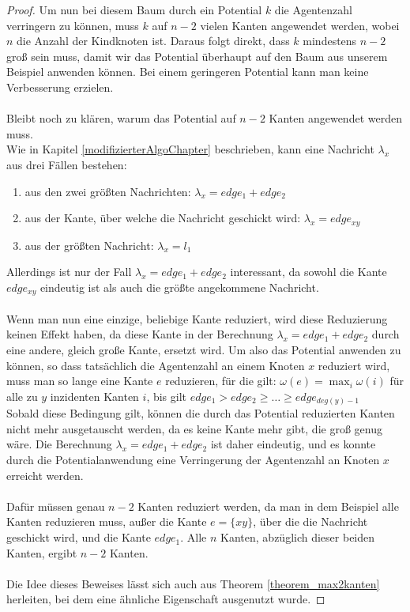 \begin{proof}
	Um nun bei diesem Baum durch ein Potential $k$ die Agentenzahl verringern zu können, muss $k$ auf $n-2$ vielen Kanten angewendet werden, wobei $n$ die Anzahl der Kindknoten ist. Daraus folgt direkt, dass $k$ mindestens $n-2$ groß sein muss, damit wir das Potential überhaupt auf den Baum aus unserem Beispiel anwenden können. Bei einem geringeren Potential kann man keine Verbesserung erzielen.
	\\
	\\
	Bleibt noch zu klären, warum das Potential auf $n-2$ Kanten angewendet werden muss.
	\\
	Wie in Kapitel \ref{modifizierterAlgoChapter} beschrieben, kann eine Nachricht $\lambda_{x}$ aus drei Fällen bestehen:
	\begin{enumerate}[label=\alph*)]
		\item aus den zwei größten Nachrichten: $\lambda_{x} = edge_{1} + edge_{2}$
		\item aus der Kante, über welche die Nachricht geschickt wird: $\lambda_{x} = edge_{xy}$
		\item aus der größten Nachricht: $\lambda_{x} = l_{1}$
	\end{enumerate}	
	Allerdings ist nur der Fall $\lambda_{x} = edge_{1} + edge_{2}$ interessant, da sowohl die Kante $edge_{xy}$ eindeutig ist als auch die größte angekommene Nachricht.
	\\
	\\
	Wenn man nun eine einzige, beliebige Kante reduziert, wird diese Reduzierung keinen Effekt haben, da diese Kante in der Berechnung $\lambda_{x} = edge_{1} + edge_{2}$ durch eine andere, gleich große Kante, ersetzt wird. Um also das Potential anwenden zu können, so dass tatsächlich die Agentenzahl an einem Knoten $x$ reduziert wird, muss man so lange eine Kante $e$ reduzieren, für die gilt: $\omega(e) = \max_{i} \omega(i)$ für alle zu $y$ inzidenten Kanten $i$, bis gilt $edge_{1} > edge_{2} \geq \dots \geq edge_{deg(y)-1}$
	\\
	Sobald diese Bedingung gilt, können die durch das Potential reduzierten Kanten nicht mehr ausgetauscht werden, da es keine Kante mehr gibt, die groß genug wäre. Die Berechnung $\lambda_{x} = edge_{1} + edge_{2}$ ist daher eindeutig, und es konnte durch die Potentialanwendung eine Verringerung der Agentenzahl an Knoten $x$ erreicht werden. 
	\\
	\\
	Dafür müssen genau $n-2$ Kanten reduziert werden, da man in dem Beispiel alle Kanten reduzieren muss, außer die Kante $e = \{xy\}$, über die die Nachricht geschickt wird, und die Kante $edge_{1}$. Alle $n$ Kanten, abzüglich dieser beiden Kanten, ergibt $n-2$ Kanten.
	\\
	\\
	Die Idee dieses Beweises lässt sich auch aus Theorem \ref{theorem_max2kanten} herleiten, bei dem eine ähnliche Eigenschaft ausgenutzt wurde.
	
\end{proof}


